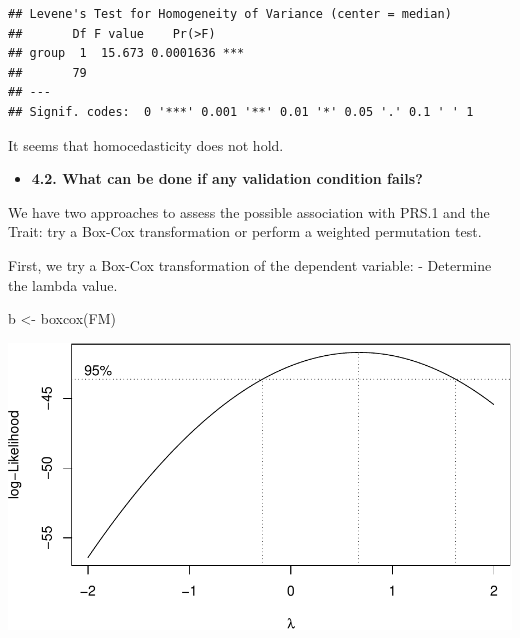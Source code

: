 \documentclass[
]{article}
\newenvironment{Shaded}{\begin{snugshade}}{\end{snugshade}}
\newcommand{\CommentTok}[1]{\textcolor[rgb]{0.56,0.35,0.01}{\textit{#1}}}
\newcommand{\FunctionTok}[1]{\textcolor[rgb]{0.00,0.00,0.00}{#1}}
\newcommand{\NormalTok}[1]{#1}
\newcommand{\OtherTok}[1]{\textcolor[rgb]{0.56,0.35,0.01}{#1}}
\newcommand{\SpecialCharTok}[1]{\textcolor[rgb]{0.00,0.00,0.00}{#1}}
\providecommand{\tightlist}{%
  \setlength{\itemsep}{0pt}\setlength{\parskip}{0pt}}
\begin{document}
\begin{verbatim}
## Levene's Test for Homogeneity of Variance (center = median)
##       Df F value    Pr(>F)    
## group  1  15.673 0.0001636 ***
##       79                      
## ---
## Signif. codes:  0 '***' 0.001 '**' 0.01 '*' 0.05 '.' 0.1 ' ' 1
\end{verbatim}

It seems that homocedasticity does not hold.

\begin{itemize}
\tightlist
\item
  \textbf{4.2. What can be done if any validation condition fails?}
\end{itemize}

We have two approaches to assess the possible association with PRS.1 and
the Trait: try a Box-Cox transformation or perform a weighted
permutation test.

First, we try a Box-Cox transformation of the dependent variable: -
Determine the lambda value.

\begin{Shaded}
\begin{Highlighting}[]
\NormalTok{b }\OtherTok{\textless{}{-}} \FunctionTok{boxcox}\NormalTok{(FM)}
\end{Highlighting}
\end{Shaded}

\includegraphics{WorkingExample3_code_files/figure-latex/unnamed-chunk-11-1.pdf}

\begin{Shaded}
\end{Shaded}
\end{document}
